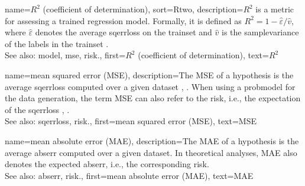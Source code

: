 {name={$R^2$ (coefficient of determination)}, 
sort={Rtwo},
	description={$R^2$ is a \gls{metric} 
		for assessing a trained \gls{regression} \gls{model}. 
		Formally, it is defined as 
		$R^2 = 1 - \widehat{\varepsilon}/\widehat{v}$, where 
		$\widehat{\varepsilon}$ denotes the average \gls{sqerrloss} 
		on the \gls{trainset} and $\widehat{v}$ is the \gls{samplevariance} 
		of the \glspl{label} in the \gls{trainset} \cite{COLINCAMERON1997329}. 
				 \\ 
		See also: \gls{model}, \gls{mse}, \gls{risk}.}, 
	first={$R^2$ (coefficient of determination)}, 
	text={$R^2$}
}

{name={mean squared error (MSE)}, 
	description={The MSE of a \gls{hypothesis} 
         	is the average \gls{sqerrloss} computed over a given \gls{dataset}
		\cite{MLBasics}, \cite{hastie01statisticallearning}. 
		When using a \gls{probmodel} for the \gls{data} generation, the 
		term MSE can also refer to the \gls{risk}, i.e., the \gls{expectation} of the 
		\gls{sqerrloss} \cite{LC}, \cite{kay}.
		\\ 
		See also: \gls{sqerrloss}, \gls{risk}.}, 
 	first={mean squared error (MSE)}, 
 	text={MSE}
}

{name={mean absolute error (MAE)}, 
	description={The MAE of a \gls{hypothesis} 
        		is the average \gls{abserr} computed over a given \gls{dataset}. 
               	In theoretical analyses, MAE also denotes the expected \gls{abserr}, 
               	i.e., the corresponding \gls{risk}.
		\\ 
		See also: \gls{abserr}, \gls{risk}.}, 
 	first={mean absolute error (MAE)}, 
 	text={MAE}
}


